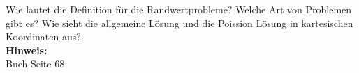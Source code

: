 \begin{question}[section=3,subsection=31,name={Randwertprobleme},difficulty=7,type=mdl,mode=exm,tags={}]
	Wie lautet die Definition für die Randwertprobleme? Welche Art von Problemen gibt es? Wie sieht die allgemeine Lösung und die Poission Lösung in kartesischen Koordinaten aus?
	\\ \textbf{Hinweis:}\\
	Buch Seite 68
\end{question}
\begin{solution}
	
\end{solution}